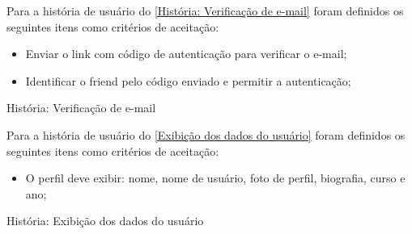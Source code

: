 Para a história de usuário do \autoref{História: Verificação de e-mail} foram definidos os seguintes itens como critérios de aceitação:

\begin{itemize}
\item Enviar o link com código de autenticação para verificar o e-mail;
\item Identificar o \gls{friend} pelo código enviado e permitir a autenticação;
\end{itemize}

\def\arraystretch{2}
\begin{quadro}[htb]
\centering
\ABNTEXfontereduzida
\caption[História: Verificação de e-mail]{História: Verificação de e-mail}
\label{História: Verificação de e-mail}
\end{quadro}
\FloatBarrier 

Para a história de usuário do \autoref{Exibição dos dados do usuário} foram definidos os seguintes itens como critérios de aceitação:

\begin{itemize}
\item O perfil deve exibir: nome, nome de usuário, foto de perfil, biografia, curso e ano;
\end{itemize}

\def\arraystretch{2}
\begin{quadro}[htb]
\centering
\ABNTEXfontereduzida
\caption[História: Exibição dos dados do usuário ]{História: Exibição dos dados do usuário}
\label{Exibição dos dados do usuário}
\end{quadro}
\FloatBarrier 

